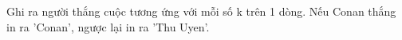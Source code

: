 Ghi ra người thắng cuộc tương ứng với mỗi số k trên 1 dòng. Nếu Conan thắng in ra 'Conan', ngược lại in ra 'Thu Uyen'.